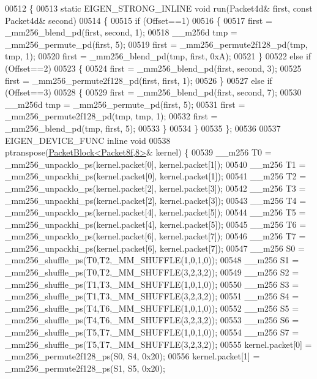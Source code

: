 \begin{DoxyCode}
{{00512 \{
00513   \textcolor{keyword}{static} EIGEN\_STRONG\_INLINE \textcolor{keywordtype}{void} run(Packet4d& first, \textcolor{keyword}{const} Packet4d& second)
00514   \{
00515     \textcolor{keywordflow}{if} (Offset==1)
00516     \{
00517       first = \_mm256\_blend\_pd(first, second, 1);
00518       \_\_m256d tmp = \_mm256\_permute\_pd(first, 5);
00519       first = \_mm256\_permute2f128\_pd(tmp, tmp, 1);
00520       first = \_mm256\_blend\_pd(tmp, first, 0xA);
00521     \}
00522     \textcolor{keywordflow}{else} \textcolor{keywordflow}{if} (Offset==2)
00523     \{
00524       first = \_mm256\_blend\_pd(first, second, 3);
00525       first = \_mm256\_permute2f128\_pd(first, first, 1);
00526     \}
00527     \textcolor{keywordflow}{else} \textcolor{keywordflow}{if} (Offset==3)
00528     \{
00529       first = \_mm256\_blend\_pd(first, second, 7);
00530       \_\_m256d tmp = \_mm256\_permute\_pd(first, 5);
00531       first = \_mm256\_permute2f128\_pd(tmp, tmp, 1);
00532       first = \_mm256\_blend\_pd(tmp, first, 5);
00533     \}
00534   \}
00535 \};
00536 
00537 EIGEN\_DEVICE\_FUNC \textcolor{keyword}{inline} \textcolor{keywordtype}{void}
00538 ptranspose(\hyperlink{struct_eigen_1_1internal_1_1_packet_block}{PacketBlock<Packet8f,8>}& kernel) \{
00539   \_\_m256 T0 = \_mm256\_unpacklo\_ps(kernel.packet[0], kernel.packet[1]);
00540   \_\_m256 T1 = \_mm256\_unpackhi\_ps(kernel.packet[0], kernel.packet[1]);
00541   \_\_m256 T2 = \_mm256\_unpacklo\_ps(kernel.packet[2], kernel.packet[3]);
00542   \_\_m256 T3 = \_mm256\_unpackhi\_ps(kernel.packet[2], kernel.packet[3]);
00543   \_\_m256 T4 = \_mm256\_unpacklo\_ps(kernel.packet[4], kernel.packet[5]);
00544   \_\_m256 T5 = \_mm256\_unpackhi\_ps(kernel.packet[4], kernel.packet[5]);
00545   \_\_m256 T6 = \_mm256\_unpacklo\_ps(kernel.packet[6], kernel.packet[7]);
00546   \_\_m256 T7 = \_mm256\_unpackhi\_ps(kernel.packet[6], kernel.packet[7]);
00547   \_\_m256 S0 = \_mm256\_shuffle\_ps(T0,T2,\_MM\_SHUFFLE(1,0,1,0));
00548   \_\_m256 S1 = \_mm256\_shuffle\_ps(T0,T2,\_MM\_SHUFFLE(3,2,3,2));
00549   \_\_m256 S2 = \_mm256\_shuffle\_ps(T1,T3,\_MM\_SHUFFLE(1,0,1,0));
00550   \_\_m256 S3 = \_mm256\_shuffle\_ps(T1,T3,\_MM\_SHUFFLE(3,2,3,2));
00551   \_\_m256 S4 = \_mm256\_shuffle\_ps(T4,T6,\_MM\_SHUFFLE(1,0,1,0));
00552   \_\_m256 S5 = \_mm256\_shuffle\_ps(T4,T6,\_MM\_SHUFFLE(3,2,3,2));
00553   \_\_m256 S6 = \_mm256\_shuffle\_ps(T5,T7,\_MM\_SHUFFLE(1,0,1,0));
00554   \_\_m256 S7 = \_mm256\_shuffle\_ps(T5,T7,\_MM\_SHUFFLE(3,2,3,2));
00555   kernel.packet[0] = \_mm256\_permute2f128\_ps(S0, S4, 0x20);
00556   kernel.packet[1] = \_mm256\_permute2f128\_ps(S1, S5, 0x20);
}}
\end{DoxyCode}
